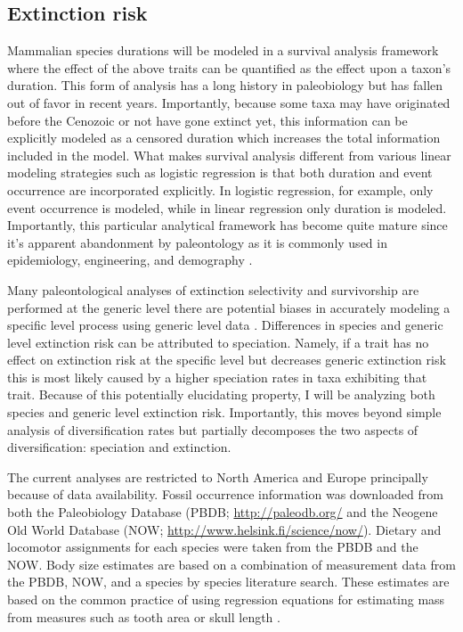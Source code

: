 \documentclass[11pt,letterpaper]{article}
\begin{document}
\subsection{Extinction risk}
Mammalian species durations will be modeled in a survival analysis framework where the effect of the above traits can be quantified as the effect upon a taxon's duration. This form of analysis has a long history in paleobiology \citep{Simpson1944,Simpson1953,VanValen1979,Baumiller1993,Foote1988} but has fallen out of favor in recent years. Importantly, because some taxa may have originated before the Cenozoic or not have gone extinct yet, this information can be explicitly modeled as a censored duration which increases the total information included in the model. What makes survival analysis different from various linear modeling strategies such as logistic regression is that both duration and event occurrence are incorporated explicitly. In logistic regression, for example, only event occurrence is modeled, while in linear regression only duration is modeled. Importantly, this particular analytical framework has become quite mature since it's apparent abandonment by paleontology as it is commonly used in epidemiology, engineering, and demography \citep{Kleinbaum2005}. 

Many paleontological analyses of extinction selectivity and survivorship are performed at the generic level \citep{Tomiya2013,Liow2008,Harnik2013,Finnegan2008,Foote2006} there are potential biases in accurately modeling a specific level process using generic level data \citep{Raup1975,Sepkoski1975,Simpson2006,Raup1991a,VanValen1979}. Differences in species and generic level extinction risk can be attributed to speciation. Namely, if a trait has no effect on extinction risk at the specific level but decreases generic extinction risk this is most likely caused by a higher speciation rates in taxa exhibiting that trait. Because of this potentially elucidating property, I will be analyzing both species and generic level extinction risk. Importantly, this moves beyond simple analysis of diversification rates but partially decomposes the two aspects of diversification: speciation and extinction.


The current analyses are restricted to North America and Europe principally because of data availability. Fossil occurrence information was downloaded from both the Paleobiology Database (PBDB; \url{http://paleodb.org/} and the Neogene Old World Database (NOW; \url{http://www.helsink.fi/science/now/}). Dietary and locomotor assignments for each species were taken from the PBDB and the NOW. Body size estimates are based on a combination of measurement data from the PBDB, NOW, and a species by species literature search. These estimates are based on the common practice of using regression equations for estimating mass from measures such as tooth area or skull length \citep{Alroy1998,Tomiya2013,Jernvall2004,Alroy2009,Slater2013a}.
\end{document}
